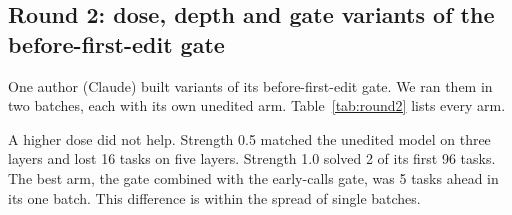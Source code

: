 \subsection{Round 2: dose, depth and gate variants of the before-first-edit gate}
\label{app:round2}
One author (Claude) built variants of its before-first-edit gate. We ran them in two batches, each with its own unedited arm. Table~\ref{tab:round2} lists every arm.

\begin{table}[h]
\caption{Round 2, 170 development tasks, one run per arm. ``Better / worse'' counts tasks solved by the arm and not by the unedited model of the same batch, and the reverse; $p$ is a two-sided sign test. Strength is in class gaps. One arm was stopped early.}
\label{tab:round2}
\centering
\small
{}
\end{table}

A higher dose did not help. Strength 0.5 matched the unedited model on three layers and lost 16 tasks on five layers. Strength 1.0 solved 2 of its first 96 tasks. The best arm, the gate combined with the early-calls gate, was 5 tasks ahead in its one batch. This difference is within the spread of single batches.

